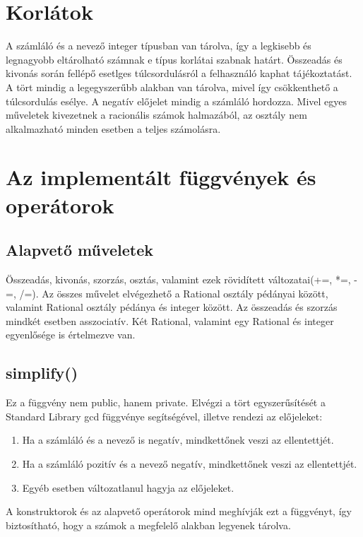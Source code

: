 \documentclass[a4paper, 12pt]{article}
\begin{document}
\section{Korlátok}
A számláló és a nevező integer típusban van tárolva, így a legkisebb és legnagyobb eltárolható számnak e típus korlátai szabnak határt. 
\newline
Összeadás és kivonás során fellépő esetlges túlcsordulásról a felhasználó kaphat tájékoztatást.
\newline
A tört mindig a legegyszerűbb alakban van tárolva, mivel így csökkenthető a túlcsordulás esélye.
\newline
A negatív előjelet mindig a számláló hordozza.
\newline
Mivel egyes műveletek kivezetnek a racionális számok halmazából, az osztály nem alkalmazható minden esetben a teljes számolásra. 

\section{Az implementált függvények és operátorok}
\subsection*{Alapvető műveletek}
Összeadás, kivonás, szorzás, osztás, valamint ezek rövidített változatai(+=, *=, -=, /=). Az összes művelet elvégezhető a Rational osztály pédányai között, valamint Rational osztály pédánya és integer között. Az összeadás és szorzás mindkét esetben asszociatív.
Két Rational, valamint egy Rational és integer egyenlősége is értelmezve van.
\subsection*{simplify()}
Ez a függvény nem public, hanem private. Elvégzi a tört egyszerűsítését a Standard Library gcd függvénye segítségével, illetve rendezi az előjeleket:
\begin{enumerate}
  \item Ha a számláló és a nevező is negatív, mindkettőnek veszi az ellentettjét.
  \item  Ha a számláló pozitív és a nevező negatív, mindkettőnek veszi az ellentettjét.
  \item  Egyéb esetben változatlanul hagyja az előjeleket.
\end{enumerate}
\noindent
 A konstruktorok és az alapvető operátorok mind meghívják ezt a függvényt, így biztosítható, hogy a számok a megfelelő alakban legyenek tárolva.
\end{document}

